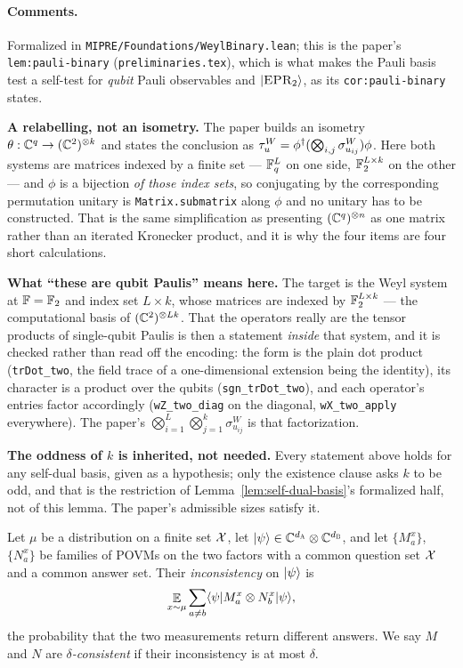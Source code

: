 \paragraph{Comments.} Formalized in \texttt{MIPRE/Foundations/WeylBinary.lean}; this is the
paper's \texttt{lem:pauli-binary} (\texttt{preliminaries.tex}), which is what makes the Pauli
basis test a self-test for \emph{qubit} Pauli observables and $|\textsc{EPR}_2\rangle$, as its
\texttt{cor:pauli-binary} states.

\textbf{A relabelling, not an isometry.} The paper builds an isometry
$\theta : \mathbb{C}^q \to (\mathbb{C}^2)^{\otimes k}$ and states the conclusion as
$\tau^W_u = \phi^\dagger (\bigotimes_{i,j} \sigma^W_{u_{ij}}) \phi$. Here both systems are
matrices indexed by a finite set --- $\mathbb{F}_q^L$ on one side, $\mathbb{F}_2^{L \times k}$ on the other ---
and $\phi$ is a bijection \emph{of those index sets}, so conjugating by the corresponding
permutation unitary is \texttt{Matrix.submatrix} along $\phi$ and no unitary has to be
constructed. That is the same simplification as presenting $(\mathbb{C}^q)^{\otimes n}$ as one matrix rather
than an iterated Kronecker product, and it is why the four items are four short calculations.

\textbf{What ``these are qubit Paulis'' means here.} The target is the Weyl system at
$\mathbb{F} = \mathbb{F}_2$ and index set $L \times k$, whose matrices are indexed by
$\mathbb{F}_2^{L \times k}$ --- the computational basis of $(\mathbb{C}^2)^{\otimes L k}$. That the operators really
are the tensor products of single-qubit Paulis is then a statement \emph{inside} that system, and
it is checked rather than read off the encoding: the form is the plain dot product
(\texttt{trDot\_two}, the field trace of a one-dimensional extension being the identity), its
character is a product over the qubits (\texttt{sgn\_trDot\_two}), and each operator's entries
factor accordingly (\texttt{wZ\_two\_diag} on the diagonal, \texttt{wX\_two\_apply} everywhere).
The paper's $\bigotimes_{i=1}^L \bigotimes_{j=1}^k \sigma^W_{u_{ij}}$ is that factorization.

\textbf{The oddness of $k$ is inherited, not needed.} Every statement above holds for any
self-dual basis, given as a hypothesis; only the existence clause asks $k$ to be odd, and that is
the restriction of Lemma~\ref{lem:self-dual-basis}'s formalized half, not of this lemma. The
paper's admissible sizes satisfy it.

\begin{definition}[Inconsistency]
\label{def:inconsistency}
\leanok
Let $\mu$ be a distribution on a finite set $\mathcal{X}$, let
$|\psi\rangle \in \mathbb{C}^{d_{\textsc{A}}} \otimes \mathbb{C}^{d_{\textsc{B}}}$, and let $\{M^x_a\}$, $\{N^x_a\}$ be
families of POVMs on the two factors with a common question set $\mathcal{X}$ and a common
answer set. Their \emph{inconsistency} on $|\psi\rangle$ is
\begin{equation*}
  \mathop{\mathbb{E}}_{x \sim \mu} \sum_{a \neq b} \langle\psi| M^x_a \otimes N^x_b |\psi\rangle,
\end{equation*}
the probability that the two measurements return different answers. We say $M$ and $N$
are \emph{$\delta$-consistent} if their inconsistency is at most $\delta$.
\end{definition}

